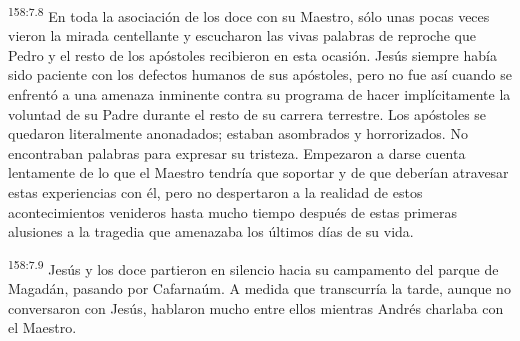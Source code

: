 \par
\textsuperscript{158:7.8} En toda la asociación de los doce con su Maestro, sólo unas pocas veces vieron la mirada centellante y escucharon las vivas palabras de reproche que Pedro y el resto de los apóstoles recibieron en esta ocasión. Jesús siempre había sido paciente con los defectos humanos de sus apóstoles, pero no fue así cuando se enfrentó a una amenaza inminente contra su programa de hacer implícitamente la voluntad de su Padre durante el resto de su carrera terrestre. Los apóstoles se quedaron literalmente anonadados; estaban asombrados y horrorizados. No encontraban palabras para expresar su tristeza. Empezaron a darse cuenta lentamente de lo que el Maestro tendría que soportar y de que deberían atravesar estas experiencias con él, pero no despertaron a la realidad de estos acontecimientos venideros hasta mucho tiempo después de estas primeras alusiones a la tragedia que amenazaba los últimos días de su vida.

\par
\textsuperscript{158:7.9} Jesús y los doce partieron en silencio hacia su campamento del parque de Magadán, pasando por Cafarnaúm. A medida que transcurría la tarde, aunque no conversaron con Jesús, hablaron mucho entre ellos mientras Andrés charlaba con el Maestro.

